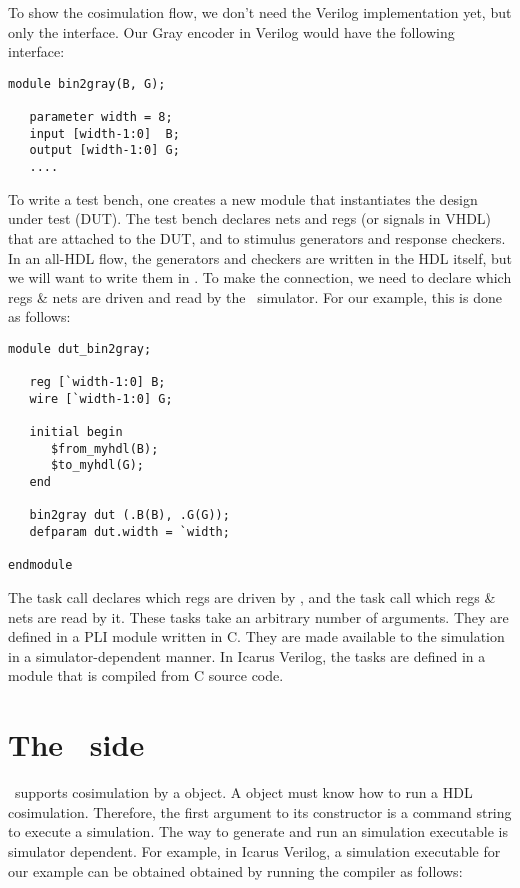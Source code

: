 To show the cosimulation flow, we don't need the Verilog
implementation yet, but only the interface.  Our Gray encoder in
Verilog would have the following interface:

\begin{verbatim}
module bin2gray(B, G);

   parameter width = 8;
   input [width-1:0]  B;     
   output [width-1:0] G;
   ....

\end{verbatim}

To write a test bench, one creates a new module that instantiates the
design under test (DUT).  The test bench declares nets and
regs (or signals in VHDL) that are attached to the DUT, and to
stimulus generators and response checkers. In an all-HDL flow, the
generators and checkers are written in the HDL itself, but we will
want to write them in \myhdl{}. To make the connection, we need to
declare which regs \& nets are driven and read by the \myhdl\
simulator. For our example, this is done as follows:

\begin{verbatim}
module dut_bin2gray;

   reg [`width-1:0] B;
   wire [`width-1:0] G;

   initial begin
      $from_myhdl(B);
      $to_myhdl(G);
   end

   bin2gray dut (.B(B), .G(G));
   defparam dut.width = `width;

endmodule

\end{verbatim}

The  task call declares which regs are driven by
\myhdl{}, and the \code{\$to_myhdl} task call which regs \& nets are read
by it. These tasks take an arbitrary number of arguments.  They
are defined in a PLI module written in C. They are made available to
the simulation in a simulator-dependent manner.  In Icarus Verilog,
the tasks are defined in a \code{myhdl.vpi} module that is compiled
from C source code.

\section{The \myhdl\ side}

\myhdl\ supports cosimulation by a  object. 
A \code{Cosimulation} object must know how to run a HDL cosimulation.
Therefore, the first argument to its constructor is a command string
to execute a simulation. The way to generate and run an
simulation executable is simulator dependent.
For example, in Icarus Verilog, a simulation executable for our
example can be obtained obtained by running the 
compiler as follows:

